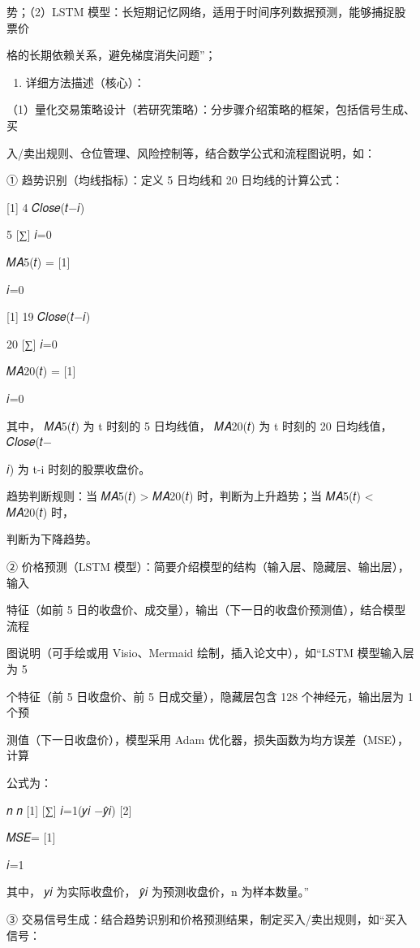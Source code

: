 \documentclass[
]{article}
\providecommand{\tightlist}{%
  \setlength{\itemsep}{0pt}\setlength{\parskip}{0pt}}
\begin{document}
势；（2）LSTM
模型：长短期记忆网络，适用于时间序列数据预测，能够捕捉股票价

格的长期依赖关系，避免梯度消失问题''；

\begin{enumerate}
\def\labelenumi{\arabic{enumi}.}
\setcounter{enumi}{2}
\tightlist
\item
  详细方法描述（核心）：
\end{enumerate}

（1）量化交易策略设计（若研究策略）：分步骤介绍策略的框架，包括信号生成、买

入/卖出规则、仓位管理、风险控制等，结合数学公式和流程图说明，如：

① 趋势识别（均线指标）：定义 5 日均线和 20 日均线的计算公式：

{[}1{]} 4 𝐶𝑙𝑜𝑠𝑒(𝑡−𝑖)

5 {[}∑{]} 𝑖=0

𝑀𝐴5(𝑡) = {[}1{]}

𝑖=0

{[}1{]} 19 𝐶𝑙𝑜𝑠𝑒(𝑡−𝑖)

20 {[}∑{]} 𝑖=0

𝑀𝐴20(𝑡) = {[}1{]}

𝑖=0

其中， 𝑀𝐴5(𝑡) 为 t 时刻的 5 日均线值， 𝑀𝐴20(𝑡) 为 t 时刻的 20 日均线值，
𝐶𝑙𝑜𝑠𝑒(𝑡−

𝑖) 为 t-i 时刻的股票收盘价。

趋势判断规则：当 𝑀𝐴5(𝑡) \textgreater{} 𝑀𝐴20(𝑡) 时，判断为上升趋势；当
𝑀𝐴5(𝑡) \textless{} 𝑀𝐴20(𝑡) 时，

判断为下降趋势。

② 价格预测（LSTM
模型）：简要介绍模型的结构（输入层、隐藏层、输出层），输入

特征（如前 5
日的收盘价、成交量），输出（下一日的收盘价预测值），结合模型流程

图说明（可手绘或用 Visio、Mermaid 绘制，插入论文中），如``LSTM
模型输入层为 5

个特征（前 5 日收盘价、前 5 日成交量），隐藏层包含 128
个神经元，输出层为 1 个预

测值（下一日收盘价），模型采用 Adam
优化器，损失函数为均方误差（MSE），计算

公式为：

𝑛 𝑛 {[}1{]} {[}∑{]} 𝑖=1(𝑦𝑖 −𝑦̂𝑖) {[}2{]}

𝑀𝑆𝐸= {[}1{]}

𝑖=1

其中， 𝑦𝑖 为实际收盘价， 𝑦̂𝑖 为预测收盘价，n 为样本数量。''

③
交易信号生成：结合趋势识别和价格预测结果，制定买入/卖出规则，如``买入信号：
\end{document}
